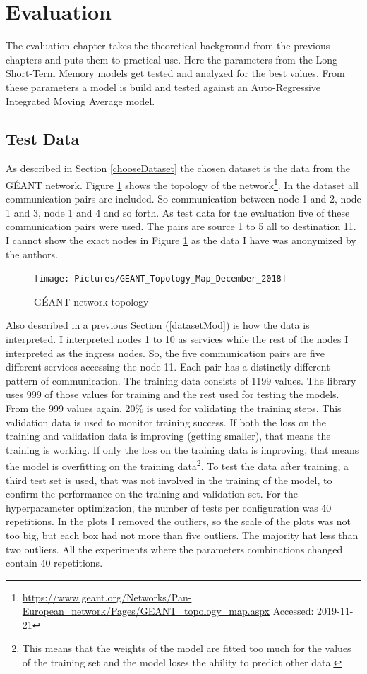 \section{Evaluation} \label{Eval}
The evaluation chapter takes the theoretical background from the previous chapters and puts them to practical use.
Here the parameters from the Long Short-Term Memory models get tested and analyzed for the best values.
From these parameters a model is build and tested against an Auto-Regressive Integrated Moving Average model.

\subsection{Test Data}
As described in Section \ref{chooseDataset} the chosen dataset is the data from the GÉANT network.
Figure \ref{fig:geanttopologymapdecember2018image} shows the topology of the network\footnote{\url{https://www.geant.org/Networks/Pan-European_network/Pages/GEANT_topology_map.aspx} Accessed: 2019-11-21}.
In the dataset all communication pairs are included.
So communication between node 1 and 2, node 1 and 3, node 1 and 4 and so forth.
As test data for the evaluation five of these communication pairs were used.
The pairs are source 1 to 5 all to destination 11.
I cannot show the exact nodes in Figure \ref{fig:geanttopologymapdecember2018image} as the data I have was anonymized by the authors.
\begin{figure}
	\centering
	\texttt{[image: Pictures/GEANT\_Topology\_Map\_December\_2018]}
	\caption{GÉANT network topology}
	\label{fig:geanttopologymapdecember2018image}
\end{figure}
Also described in a previous Section (\ref{datasetMod}) is how the data is interpreted.
I interpreted nodes 1 to 10 as services while the rest of the nodes I interpreted as the ingress nodes.
So, the five communication pairs are five different services accessing the node 11.
Each pair has a distinctly different pattern of communication.
The training data consists of 1199 values.
The library uses 999 of those values for training and the rest used for testing the models.
From the 999 values again, 20\% is used for validating the training steps.
This validation data is used to monitor training success.
If both the loss on the training and validation data is improving (getting smaller), that means the training is working.
If only the loss on the training data is improving, that means the model is overfitting on the training data\footnote{This means that the weights of the model are fitted too much for the values of the training set and the model loses the ability to predict other data.}.
To test the data after training, a third test set is used, that was not involved in the training of the model, to confirm the performance on the training and validation set.
For the hyperparameter optimization, the number of tests per configuration was 40 repetitions.
In the plots I removed the outliers, so the scale of the plots was not too big, but each box had not more than five outliers.
The majority hat less than two outliers.
All the experiments where the parameters combinations changed contain 40 repetitions.


